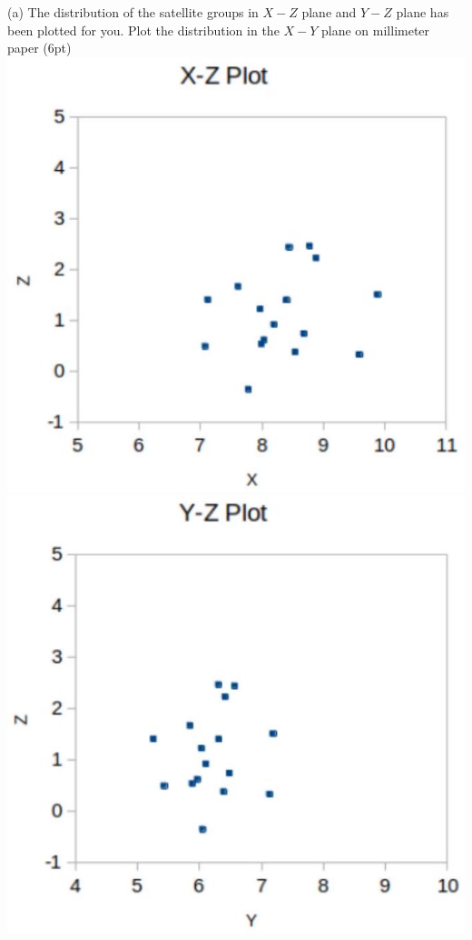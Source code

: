 \documentclass[10pt]{article}
\begin{document}
(a) The distribution of the satellite groups in $X-Z$ plane and $Y-Z$ plane has been plotted for you. Plot the distribution in the $X-Y$ plane on millimeter paper (6pt)\\
\includegraphics[max width=\textwidth, center]{2025_09_11_3681df2e94a9f94ef296g-5}\\
\includegraphics[max width=\textwidth, center]{2025_09_11_3681df2e94a9f94ef296g-5(1)}\\
\end{document}
